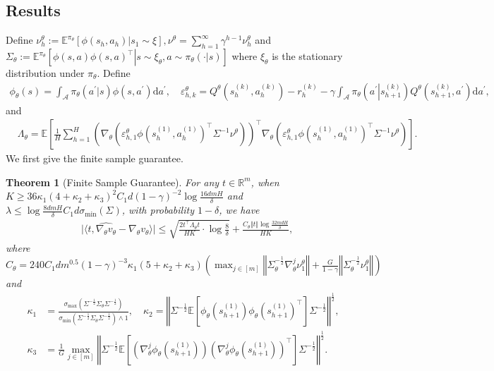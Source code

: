 \documentclass{article}
\newtheorem{theorem}{Theorem}[section]
\numberwithin{equation}{section}
\begin{document}
\subsection{Results}
Define $\nu^\theta_h:=\mathbb{E}^{\pi_\theta}\left[\phi(s_h,a_h)\vert s_1\sim\xi\right], \nu^\theta=\sum_{h=1}^\infty\gamma^{h-1}\nu^\theta_h$ and $\Sigma_\theta:=\mathbb{E}^{\pi_\theta}\left[\left.\phi(s,a)\phi(s,a)^\top\right\vert s\sim\xi_\theta, a\sim\pi_\theta(\cdot\vert s)\right]$ where $\xi_\theta$ is the stationary distribution under $\pi_\theta$. Define
\begin{align*}
\phi_\theta(s)=\int_{\mathcal{A}}\pi_\theta(a^\prime\vert s)\phi(s,a^\prime)\mathrm{d}a^\prime,\quad\varepsilon_{h,k}^\theta=Q^\theta\left(s_h^{(k)},a_h^{(k)}\right)-r_h^{(k)}-\gamma\int_{\mathcal{A}}\pi_\theta\left(a^\prime\left\vert s_{h+1}^{(k)}\right.\right)Q^\theta\left(s_{h+1}^{(k)},a^\prime\right)\mathrm{d}a^\prime,     
\end{align*}
and 
\begin{align*}
   &\Lambda_\theta=\mathbb{E}\left[\frac{1}{H}\sum_{h=1}^H\left(\nabla_\theta\left(\varepsilon^\theta_{h,1}\phi\left(s_h^{(1)},a_h^{(1)}\right)^\top\Sigma^{-1}\nu^\theta\right)\right)^\top\nabla_\theta\left(\varepsilon^\theta_{h,1}\phi\left(s_h^{(1)},a_h^{(1)}\right)^\top\Sigma^{-1}\nu^\theta\right)\right].
\end{align*}
We first give the finite sample guarantee. 
\begin{theorem}[Finite Sample Guarantee] 
\label{thm2_var_homo}
For any $t\in\mathbb{R}^m$, when $K\geq 36\kappa_1(4+\kappa_2+\kappa_3)^2C_1d(1-\gamma)^{-2}\log\frac{16dmH}{\delta}$ and $\lambda\leq\log\frac{8dmH}{\delta}C_1d\sigma_{\min}(\Sigma)$, with probability $1-\delta$, we have
\begin{align*}
    &\vert\langle t, \widehat{\nabla_\theta v_\theta}-\nabla_\theta v_\theta\rangle \vert\leq  \sqrt{\frac{2t^\top\Lambda_\theta t}{HK}\cdot \log\frac{8}{\delta}}+\frac{C_\theta\Vert t\Vert\log\frac{32mdH}{\delta}}{HK},
\end{align*}
where $C_\theta=240C_1dm^{0.5}(1-\gamma)^{-3}\kappa_1(5+\kappa_2+\kappa_3)\left(\max_{j\in[m]}\left\Vert\Sigma_\theta^{-\frac{1}{2}}\nabla_\theta^j\nu^\theta_1\right\Vert+\frac{G}{1-\gamma}\left\Vert\Sigma_\theta^{-\frac{1}{2}}\nu^\theta_1\right\Vert\right)$ and
\begin{align*}
    \kappa_1&=\frac{\sigma_{\max}\left(\Sigma^{-\frac{1}{2}}\Sigma_\theta\Sigma^{-\frac{1}{2}}\right)}{\sigma_{\min}\left(\Sigma^{-\frac{1}{2}}\Sigma_\theta\Sigma^{-\frac{1}{2}}\right)\wedge 1},\quad\kappa_2=\left\Vert\Sigma^{-\frac{1}{2}}\mathbb{E}\left[\phi_\theta\left(s_{h+1}^{(1)}\right)\phi_\theta\left(s_{h+1}^{(1)}\right)^\top\right]\Sigma^{-\frac{1}{2}}\right\Vert^{\frac{1}{2}},\\
    \kappa_3&=\frac{1}{G}\max_{j\in[m]}\left\Vert\Sigma^{-\frac{1}{2}}\mathbb{E}\left[\left(\nabla_\theta^j\phi_\theta\left(s_{h+1}^{(1)}\right)\right)\left(\nabla_\theta^j\phi_\theta\left(s_{h+1}^{(1)}\right)\right)^\top\right]\Sigma^{-\frac{1}{2}}\right\Vert^{\frac{1}{2}}.
\end{align*}
\end{theorem}
\end{document}
